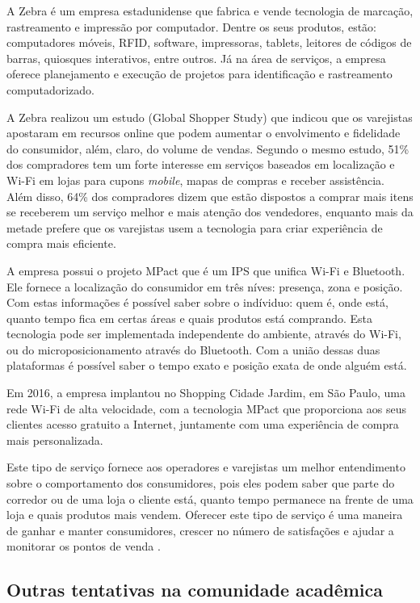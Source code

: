A Zebra é um empresa estadunidense que fabrica e vende tecnologia de marcação,
rastreamento e impressão por computador. Dentre os seus produtos, estão:
computadores móveis, RFID, software, impressoras, tablets, leitores de códigos
de barras, quiosques interativos, entre outros. Já na área de serviços, a empresa
oferece planejamento e execução de projetos para identificação e rastreamento computadorizado.

A Zebra realizou um estudo (Global Shopper Study) que indicou que os varejistas
apostaram em recursos online que podem aumentar o envolvimento e fidelidade do
consumidor, além, claro, do volume de vendas. Segundo o mesmo estudo, 51\% dos
compradores tem um forte interesse em serviços baseados em localização e
Wi-Fi em lojas para cupons \emph{mobile}, mapas de compras e receber
assistência. Além disso, 64\% dos compradores dizem que estão dispostos a comprar
mais itens se receberem um serviço melhor e mais atenção dos vendedores,
enquanto mais da metade prefere que os varejistas usem a tecnologia para criar
experiência de compra mais eficiente.

A empresa possui o projeto MPact que é um IPS que unifica
Wi-Fi e Bluetooth. Ele fornece a localização do consumidor em três
níves: presença, zona e posição. Com estas informações é possível saber sobre o
indíviduo: quem é, onde está, quanto tempo fica em certas áreas e quais
produtos está comprando. Esta tecnologia pode ser implementada independente do
ambiente, através do Wi-Fi, ou do microposicionamento através do
Bluetooth. Com a união dessas duas plataformas é possível saber o tempo
exato e posição exata de onde alguém está.

Em 2016, a empresa implantou no Shopping Cidade Jardim, em São Paulo, uma rede
Wi-Fi de alta velocidade, com a tecnologia MPact que proporciona aos
seus clientes acesso gratuito a Internet, juntamente com uma experiência de
compra mais personalizada.

Este tipo de serviço fornece aos operadores
e varejistas um melhor entendimento sobre o comportamento dos consumidores, pois eles
podem saber que parte do corredor ou de uma loja o cliente está, quanto tempo
permanece na frente de uma loja e quais produtos mais vendem. Oferecer este tipo
de serviço é uma maneira de ganhar e manter consumidores, crescer no número de
satisfações e ajudar a monitorar os pontos de venda \cite{ZebraCidadeJardim}.

\subsection{Outras tentativas na comunidade acadêmica}
\label{subsec:Outras tentativas na comunidade acadêmica}

